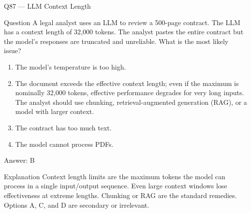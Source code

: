 \documentclass[aspectratio=169,8pt]{beamer}
\begin{document}
\begin{frame}{Q87 --- LLM Context Length}
\begin{block}{Question}
A legal analyst uses an LLM to review a 500-page contract. The LLM has a context length of 32,000 tokens. The analyst pastes the entire contract but the model's responses are truncated and unreliable. What is the most likely issue?
\end{block}
\begin{enumerate}
\item The model's temperature is too high.
\item The document exceeds the effective context length; even if the maximum is nominally 32,000 tokens, effective performance degrades for very long inputs. The analyst should use chunking, retrieval-augmented generation (RAG), or a model with larger context.
\item The contract has too much text.
\item The model cannot process PDFs.
\end{enumerate}
\begin{exampleblock}{Answer: B}\end{exampleblock}
\begin{block}{Explanation}
Context length limits are the maximum tokens the model can process in a single input/output sequence. Even large context windows lose effectiveness at extreme lengths. Chunking or RAG are the standard remedies. Options A, C, and D are secondary or irrelevant.
\end{block}
\end{frame}
\end{document}
